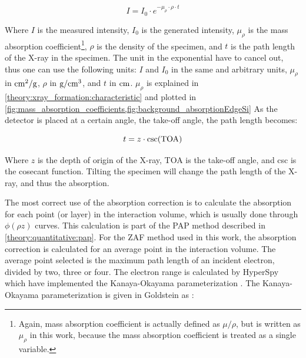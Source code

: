 \begin{equation}
    \label{eq:theory:quantitative:absorption}
    I = I_0 \cdot e^{-\mu_{\rho} \cdot \rho \cdot t}
\end{equation}

Where $I$ is the measured intensity, $I_0$ is the generated intensity, $\mu_{\rho}$ is the mass absorption coefficient\footnote{Again, mass absorption coefficient is actually defined as $\mu/\rho$, but is written as $\mu_\rho$ in this work, because the mass absorption coefficient is treated as a single variable.},
$\rho$ is the density of the specimen, and $t$ is the path length of the X-ray in the specimen.
The unit in the exponential have to cancel out, thus one can use the following units: $I$ and $I_0$ in the same and arbitrary units, $\mu_{\rho}$ in $\textnormal{cm}^2/\textnormal{g}$, $\rho$ in $\textnormal{g}/\textnormal{cm}^3$, and $t$ in $\textnormal{cm}$.
$\mu_{\rho}$ is explained in \cref{theory:xray_formation:characteristic} and plotted in \cref{fig:mass_absorption_coefficients,fig:background_absorptionEdgeSi}
As the detector is placed at a certain angle, the take-off angle, the path length becomes:

\begin{equation}
    \label{eq:theory:quantitative:path_length}
    t = z \cdot \csc(\textnormal{TOA})
\end{equation}

Where $z$ is the depth of origin of the X-ray, TOA is the take-off angle, and csc is the cosecant function.
Tilting the specimen will change the path length of the X-ray, and thus the absorption.


The most correct use of the absorption correction is to calculate the absorption for each point (or layer) in the interaction volume, which is usually done through $\phi(\rho z)$ curves.
This calculation is part of the PAP method described in \cref{theory:quantitative:pap}.
For the ZAF method used in this work, the absorption correction is calculated for an average point in the interaction volume.
The average point selected is the maximum path length of an incident electron, divided by two, three or four.
The electron range is calculated by HyperSpy which have implemented the Kanaya-Okayama parameterization \cite{kanaya1972}.
The Kanaya-Okayama parameterization is given in Goldstein as \cite[Eq. 14.1 and 22.5]{goldstein_scanning_2018}:

